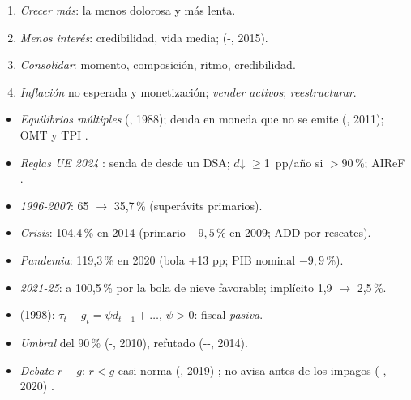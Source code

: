 \documentclass{article}
\begin{document}
\begin{columnas}
\begin{enumerate}
\item \emph{Crecer más}: la menos dolorosa y más lenta.
\item \emph{Menos interés}: credibilidad, vida media;  (-, 2015).
\item \emph{Consolidar}: momento, composición, ritmo, credibilidad.
\item \emph{Inflación} no esperada y monetización; \emph{vender activos}; \emph{reestructurar}.
\end{enumerate}
\begin{itemize}
\item \emph{Equilibrios múltiples} (, 1988); deuda en moneda que no se emite (, 2011); OMT y TPI .
\item \emph{Reglas UE 2024} : senda de  desde un DSA; $d$↓ $\geq$1~pp/año si $>90$\,\%; AIReF .
\end{itemize}

\begin{itemize}
\item \emph{1996-2007}: 65 $\to$ 35,7\,\% (superávits primarios).
\item \emph{Crisis}: 104,4\,\% en 2014 (primario $-9{,}5$\,\% en 2009; ADD por rescates).
\item \emph{Pandemia}: 119,3\,\% en 2020 (bola +13 pp; PIB nominal $-9{,}9$\,\%).
\item \emph{2021-25}: a 100,5\,\% por la bola de nieve favorable; implícito 1,9 $\to$ 2,5\,\%.
\end{itemize}

\begin{itemize}
\item {} (1998): $\tau_t-g_t=\psi d_{t-1}+\ldots$, $\psi>0$: fiscal \emph{pasiva}.
\item \emph{Umbral} del 90\,\% (-, 2010), refutado (--, 2014).
\item \emph{Debate $r-g$}: $r<g$ casi norma (, 2019) ; no avisa antes de los impagos (-, 2020) .
\end{itemize}


\end{columnas}
\end{document}
